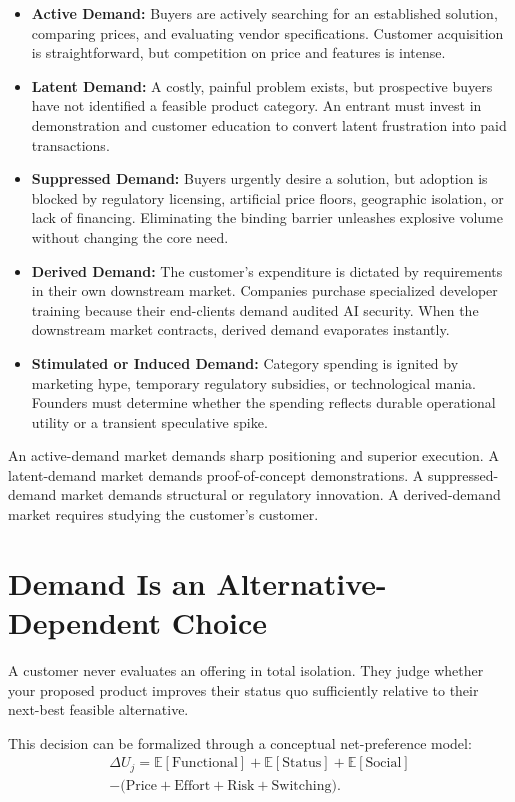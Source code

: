 \begin{itemize}[leftmargin=12pt,itemsep=3pt,topsep=2pt]
  \item \textbf{Active Demand:} Buyers are actively searching for an established solution, comparing prices, and evaluating vendor specifications. Customer acquisition is straightforward, but competition on price and features is intense.
  \item \textbf{Latent Demand:} A costly, painful problem exists, but prospective buyers have not identified a feasible product category. An entrant must invest in demonstration and customer education to convert latent frustration into paid transactions.
  \item \textbf{Suppressed Demand:} Buyers urgently desire a solution, but adoption is blocked by regulatory licensing, artificial price floors, geographic isolation, or lack of financing. Eliminating the binding barrier unleashes explosive volume without changing the core need.
  \item \textbf{Derived Demand:} The customer's expenditure is dictated by requirements in their own downstream market. Companies purchase specialized developer training because their end-clients demand audited AI security. When the downstream market contracts, derived demand evaporates instantly.
  \item \textbf{Stimulated or Induced Demand:} Category spending is ignited by marketing hype, temporary regulatory subsidies, or technological mania. Founders must determine whether the spending reflects durable operational utility or a transient speculative spike.
\end{itemize}

An active-demand market demands sharp positioning and superior execution. A latent-demand market demands proof-of-concept demonstrations. A suppressed-demand market demands structural or regulatory innovation. A derived-demand market requires studying the customer's customer.

\section{Demand Is an Alternative-Dependent Choice}

A customer never evaluates an offering in total isolation. They judge whether your proposed product improves their status quo sufficiently relative to their next-best feasible alternative.

This decision can be formalized through a conceptual net-preference model:
\begin{multline}
\label{eq:net_preference}
\Delta U_j = \mathbb{E}[\text{Functional}] + \mathbb{E}[\text{Status}] + \mathbb{E}[\text{Social}] \\
- \bigl(\text{Price} + \text{Effort} + \text{Risk} + \text{Switching}\bigr).
\end{multline}

